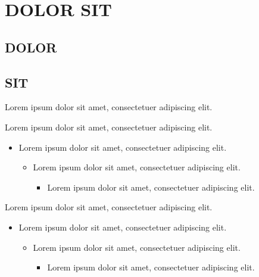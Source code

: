 \documentclass[11pt, aspectratio=169]{beamer}
\begin{document}

\section{DOLOR SIT}
\subsection{DOLOR}
\subsection{SIT}

\begin{frame}[t]{\secname}{Lorem ipsum dolor sit amet, consectetuer adipiscing elit.}
    \begin{minipage}[t]{0.47\textwidth}
        Lorem ipsum dolor sit amet, consectetuer adipiscing elit.
        \begin{itemize}
            \item Lorem ipsum dolor sit amet, consectetuer adipiscing elit.
            \begin{itemize}
                \item Lorem ipsum dolor sit amet, consectetuer adipiscing elit.
                \begin{itemize}
                    \item Lorem ipsum dolor sit amet, consectetuer adipiscing elit.
                \end{itemize}
            \end{itemize}
        \end{itemize}
    \end{minipage}
    \hfill
    \begin{minipage}[t]{0.47\textwidth}
        Lorem ipsum dolor sit amet, consectetuer adipiscing elit.
        \begin{itemize}
            \item Lorem ipsum dolor sit amet, consectetuer adipiscing elit.
            \begin{itemize}
                \item Lorem ipsum dolor sit amet, consectetuer adipiscing elit.
                \begin{itemize}
                    \item Lorem ipsum dolor sit amet, consectetuer adipiscing elit.
                \end{itemize}
            \end{itemize}
        \end{itemize}
    \end{minipage}
\end{frame}
\end{document}
